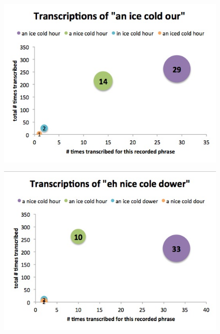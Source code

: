 \begin{figure}[h]
\begin{center}
\includegraphics[width=\piechartwidth]{bubbleChartTranscriptionFrequency_an_iceColdOur.jpg}
\captionfonts
\caption[Most common transcriptions for the recorded phrase "a NiceColdOur"]{}
\label{bubbleChart:an_niceColdOur}
\end{center}
\end{figure}

\begin{figure}[h]
\begin{center}
\includegraphics[width=\piechartwidth]{bubbleChartTranscriptionFrequency_ehNiceColeDower.jpg}
\captionfonts
\caption[Most common transcriptions for the recorded phrase "ehNiceColeDower"]{}
\label{bubbleChart:ehNiceColeDower}
\end{center}
\end{figure}


